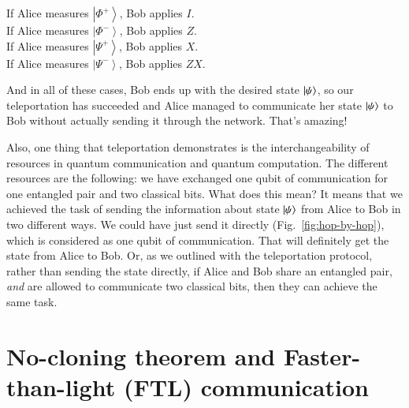 \noindent
If Alice measures $\left|\Phi^{+}\right\rangle$, Bob applies $I$.\\
If Alice measures $\left|\Phi^{-}\right\rangle$, Bob applies $Z$.\\
If Alice measures $\left|\Psi^{+}\right\rangle$, Bob applies $X$.\\
If Alice measures $\left|\Psi^{-}\right\rangle$, Bob applies $Z X$.

And in all of these cases, Bob ends up with the desired state $\left| \psi \right\rangle$, so our teleportation has succeeded and Alice managed to communicate her state $\left| \psi \right\rangle$ to Bob without actually sending it through the network. That's amazing!

Also, one thing that teleportation demonstrates is the interchangeability of resources in quantum communication and quantum computation. The different resources are the following: we have exchanged one qubit of communication for one entangled pair and two classical bits. What does this mean? It means that we achieved the task of sending the information about state $\left| \psi \right\rangle$ from Alice to Bob in two different ways. We could have just send it directly (Fig.~\ref{fig:hop-by-hop}), which is considered as one qubit of communication. That will definitely get the state from Alice to Bob. Or, as we outlined with the teleportation protocol, rather than sending the state directly, if Alice and Bob share an entangled pair, \emph{and} are allowed to communicate two classical bits, then they can achieve the same task.

\section{No-cloning theorem and Faster-than-light (FTL) communication}
\label{sec:8-3_no-cloning}


